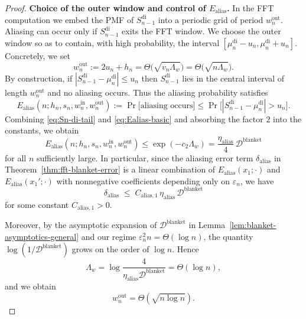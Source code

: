 \documentclass{article}
\theoremstyle{plain}
\theoremstyle{definition}
\begin{document}
\begin{proof}
\textbf{Choice of the outer window and control of $E_{\mathrm{alias}}$.}
In the FFT computation we embed the PMF of $S_{n-1}^{\mathrm{di}}$ into
a periodic grid of period $w_n^{\mathrm{out}}$.
Aliasing can occur only if $S_{n-1}^{\mathrm{di}}$ exits the FFT window.
We choose the outer window so as to contain, with high probability, the
interval
$[\mu_n^{\mathrm{di}}-u_n,\mu_n^{\mathrm{di}}+u_n]$. %
Concretely, we set
\begin{equation}
  \label{eq:wouter-def}
  w_n^{\mathrm{out}}
  :=
  2u_n + h_n %
  = \Theta\bigl(\sqrt{v_n\Lambda_w}\bigr)
  = \Theta\bigl(\sqrt{n\Lambda_w}\bigr).
\end{equation}
By construction, if $|S_{n-1}^{\mathrm{di}} - \mu_n^{\mathrm{di}}|\le u_n$ %
then $S_{n-1}^{\mathrm{di}}$ lies in the central interval of length
$w_n^{\mathrm{out}}$ and no aliasing occurs.
Thus the aliasing probability satisfies
\begin{equation}
  \label{eq:Ealias-basic}
  E_{\mathrm{alias}}(n;h_n,s_n,w_n^{\mathrm{in}},w_n^{\mathrm{out}})
  :=
  \Pr\bigl[\text{aliasing occurs}\bigr]
  \le
  \Pr\bigl[|S_{n-1}^{\mathrm{di}} - \mu_n^{\mathrm{di}}|>u_n\bigr].
\end{equation}
Combining \eqref{eq:Sn-di-tail} and \eqref{eq:Ealias-basic} and
absorbing the factor $2$ into the constants, we obtain
\[
  E_{\mathrm{alias}}(n;h_n,s_n,w_n^{\mathrm{in}},w_n^{\mathrm{out}})
  \le
  \exp(-c_2\Lambda_w)
  =
  \frac{\eta_{\mathrm{alias}}}{4}\,\mathcal{D}^{\mathrm{blanket}}
\]
for all $n$ sufficiently large.
In particular, since the aliasing error term
$\delta_{\mathrm{alias}}$ in Theorem~\ref{thm:fft-blanket-error} is a
linear combination of $E_{\mathrm{alias}}(x_1;\cdot)$ and
$E_{\mathrm{alias}}(x_1';\cdot)$ with nonnegative coefficients
depending only on $\varepsilon_n$, we have
\begin{equation}
  \label{eq:delta-alias-vs-Dblanket}
  \delta_{\mathrm{alias}}
  \;\le\;
  C_{\mathrm{alias},1}\,
  \eta_{\mathrm{alias}}\,
  \mathcal{D}^{\mathrm{blanket}}
\end{equation}
for some constant $C_{\mathrm{alias},1}>0$.

Moreover, by the asymptotic expansion of $\mathcal{D}^{\mathrm{blanket}}$ in
Lemma~\ref{lem:blanket-asymptotics-general} and our regime
$\varepsilon_n^2 n = \Theta(\log n)$, the quantity
$\log(1/\mathcal{D}^{\mathrm{blanket}})$ grows on the order of $\log n$. Hence
\[
  \Lambda_w
  =
  \log\frac{4}{\eta_{\mathrm{alias}}\mathcal{D}^{\mathrm{blanket}}}
  = \Theta(\log n),
\]
and we obtain
\begin{equation}
  \label{eq:wouter-asymp-final}
  w_n^{\mathrm{out}}
  = \Theta(\sqrt{n\log n}).
\end{equation}


\end{proof}
\end{document}
